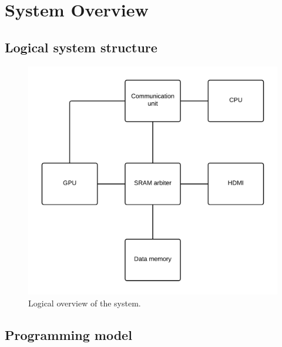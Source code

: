 \chapter{System Overview}

\section{Logical system structure}
\begin{figure}[H]
	\centering
	\includegraphics[scale=0.3]{system_overview/diagrams/logical_overview.png}
	\caption{Logical overview of the system.}
	\label{logical_overview}
\end{figure}



\section{Programming model}

